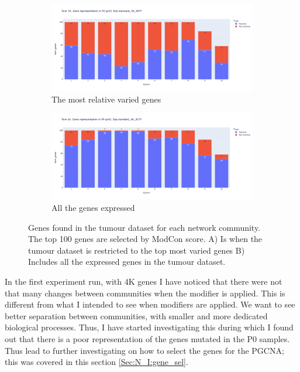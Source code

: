 \begin{figure}[!htb]
    \hfill
    \begin{subfigure}[b]{0.47\textwidth}
        \centering
        \includegraphics[width=\textwidth,keepaspectratio]{Sections/Network_I/Resources/P0/4K_p0_modConMev_rep_standard_4K_50TF.png}
        \caption{The most relative varied genes}
    \end{subfigure}
    \hfill
    \begin{subfigure}[b]{0.47\textwidth}
        \centering
        \includegraphics[width=\textwidth,keepaspectratio]{Sections/Network_I/Resources/P0/10K_p0_modConMev_rep_standard_4K_50TF.png}
        \caption{All the genes expressed}
    \end{subfigure}
    \hfill
    \caption{Genes found in the tumour dataset for each network community. The top 100 genes are selected by ModCon score. A) Is when the tumour dataset is restricted to the top most varied genes B) Includes all the expressed genes in the tumour dataset. }
    \label{fig:N_I:p0_mev_rep}
\end{figure}



\newpage

In the first experiment run, with 4K genes I have noticed that there were not that many changes between communities when the modifier is applied. This is different from what I intended to see when modifiers are applied. We want to see better separation between communities, with smaller and more dedicated biological processes. Thus, I have started investigating this during which I found out that there is a poor representation of the genes mutated in the P0 samples. Thus lead to further investigating on how to select the genes for the PGCNA; this was covered in this section \ref{Sec:N_I:gene_sel}.

